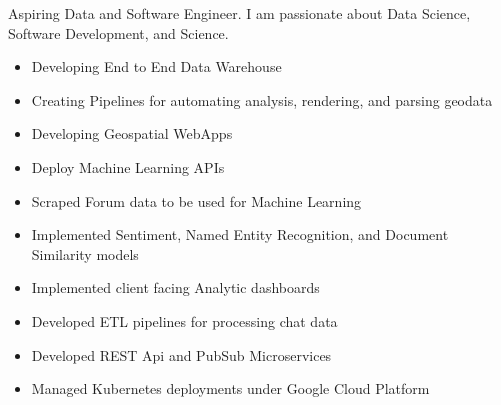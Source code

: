 \documentclass[10pt,a4paper]{altacv}
\begin{document}

\begin{fullwidth}
  \makecvheader

\end{fullwidth}


Aspiring Data and Software Engineer. I am passionate about Data Science, Software Development, and Science.



\begin{itemize}
  \item Developing End to End Data Warehouse
  \item Creating Pipelines for automating analysis, rendering, and parsing geodata
  \item Developing Geospatial WebApps
  \item Deploy Machine Learning APIs
\end{itemize}

\divider

\begin{itemize}
  \item Scraped Forum data to be used for Machine Learning
  \item Implemented Sentiment, Named Entity Recognition, and Document Similarity models
  \item Implemented client facing Analytic dashboards
  \item Developed ETL pipelines for processing chat data
  \item Developed REST Api and PubSub Microservices
  \item Managed Kubernetes deployments under Google Cloud Platform
\end{itemize}
\end{document}
